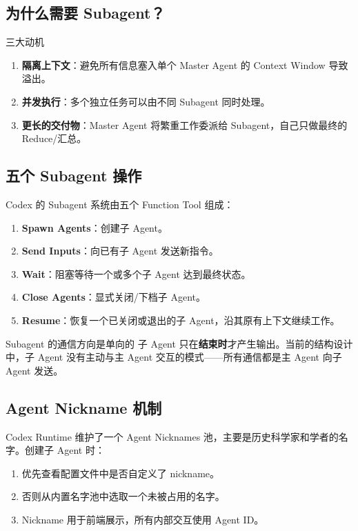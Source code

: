 \documentclass[a4paper]{article}
\begin{document}
\subsection{为什么需要 Subagent？}

\begin{importantbox}{三大动机}
\begin{enumerate}
    \item \textbf{隔离上下文}：避免所有信息塞入单个 Master Agent 的 Context Window 导致溢出。
    \item \textbf{并发执行}：多个独立任务可以由不同 Subagent 同时处理。
    \item \textbf{更长的交付物}：Master Agent 将繁重工作委派给 Subagent，自己只做最终的 Reduce/汇总。
\end{enumerate}
\end{importantbox}

\subsection{五个 Subagent 操作}

Codex 的 Subagent 系统由五个 Function Tool 组成：

\begin{enumerate}
    \item \textbf{Spawn Agents}：创建子 Agent。
    \item \textbf{Send Inputs}：向已有子 Agent 发送新指令。
    \item \textbf{Wait}：阻塞等待一个或多个子 Agent 达到最终状态。
    \item \textbf{Close Agents}：显式关闭/下档子 Agent。
    \item \textbf{Resume}：恢复一个已关闭或退出的子 Agent，沿其原有上下文继续工作。
\end{enumerate}

\begin{warningbox}{Subagent 的通信方向是单向的}
子 Agent 只在\textbf{结束时}才产生输出。当前的结构设计中，子 Agent 没有主动与主 Agent 交互的模式——所有通信都是主 Agent 向子 Agent 发送。
\end{warningbox}

\subsection{Agent Nickname 机制}

Codex Runtime 维护了一个 Agent Nicknames 池，主要是历史科学家和学者的名字。创建子 Agent 时：
\begin{enumerate}
    \item 优先查看配置文件中是否自定义了 nickname。
    \item 否则从内置名字池中选取一个未被占用的名字。
    \item Nickname 用于前端展示，所有内部交互使用 Agent ID。
\end{enumerate}
\end{document}
